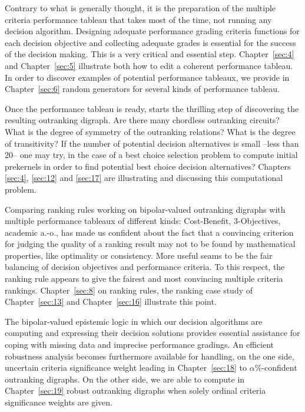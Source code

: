 Contrary to what is generally thought, it is the preparation of the multiple criteria performance tableau that takes most of the time, not running any decision algorithm. Designing adequate performance grading criteria functions for each decision objective and collecting  adequate grades is essential for the success of the decision making. This is a very critical and essential step. Chapter~\ref{sec:4} and Chapter~\ref{sec:5} illustrate both how to edit a coherent performance tableau. In order to discover examples of potential performance tableaux, we provide in Chapter~\vref{sec:6} random generators for several kinds of performance tableau. 

Once the performance tableau is ready, starts the thrilling step of discovering the resulting outranking digraph. Are there many chordless outranking circuits? What is the degree of symmetry of the outranking relations? What is the degree of transitivity?  If the number of potential decision alternatives is small --less than 20-- one may try, in the case of a best choice selection problem to compute initial prekernels in order to find potential best choice decision alternatives? Chapters \vref{sec:4}, \vref{sec:12} and \vref{sec:17} are illustrating and discussing this computational problem.

Comparing ranking rules working on bipolar-valued outranking digraphs  with multiple performance tableaux of different kinds: Cost-Benefit, 3-Objectives, academic a.-o., has made us confident about the fact that a convincing criterion for judging the quality of a ranking result may not to be found by mathematical properties, like \Kemeny optimality or \Condorcet consistency. More useful seams to be the fair balancing of decision objectives and performance criteria. To this respect, the \NetFlows ranking rule appears to give the fairest and most convincing multiple criteria rankings. Chapter~\vref{sec:8} on ranking rules, the ranking case study of Chapter~\vref{sec:13} and Chapter~\vref{sec:16} illustrate this point.

The bipolar-valued epistemic logic in which our decision algorithms are computing and expressing their decision solutions provides essential assistance for coping with missing data and imprecise performance gradings. An efficient robustness analysis becomes furthermore available for handling, on the one side, uncertain criteria significance weight leading in Chapter~\ref{sec:18} to $\alpha\%$-confident outranking digraphs. On the other side, we are able to compute in Chapter~\vref{sec:19} robust outranking digraphs when solely ordinal criteria significance weights are given.

